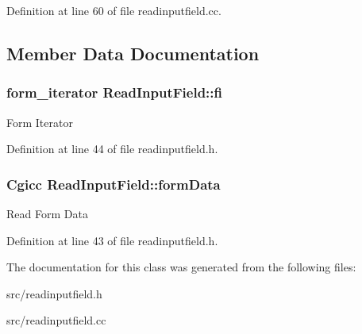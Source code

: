 Definition at line 60 of file readinputfield.\-cc.



\subsection{Member Data Documentation}
\hypertarget{classReadInputField_ae252dc321be04c2c1afa6928ad16a45d}{
\subsubsection[{fi}]{\setlength{\rightskip}{0pt plus 5cm}form\-\_\-iterator Read\-Input\-Field\-::fi\hspace{0.3cm}{\ttfamily [protected]}}}\label{classReadInputField_ae252dc321be04c2c1afa6928ad16a45d}
Form Iterator 

Definition at line 44 of file readinputfield.\-h.

\hypertarget{classReadInputField_a1e4ebac8979fd9b2771320d669fce5fc}{
\subsubsection[{form\-Data}]{\setlength{\rightskip}{0pt plus 5cm}Cgicc Read\-Input\-Field\-::form\-Data\hspace{0.3cm}{\ttfamily [protected]}}}\label{classReadInputField_a1e4ebac8979fd9b2771320d669fce5fc}
Read Form Data 

Definition at line 43 of file readinputfield.\-h.



The documentation for this class was generated from the following files\-:\begin{DoxyCompactItemize}
\item 
src/readinputfield.\-h\item 
src/readinputfield.\-cc\end{DoxyCompactItemize}

